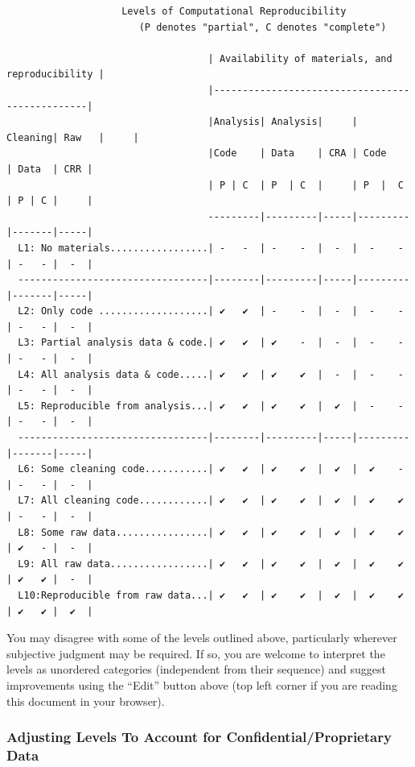 \documentclass[]{book}
\begin{document}
\begin{verbatim}
                    Levels of Computational Reproducibility
                       (P denotes "partial", C denotes "complete")

                                   | Availability of materials, and reproducibility |
                                   |------------------------------------------------|
                                   |Analysis| Analysis|     | Cleaning| Raw   |     |
                                   |Code    | Data    | CRA | Code    | Data  | CRR |
                                   | P | C  | P  | C  |     | P  |  C | P | C |     |
                                   ---------|---------|-----|---------|-------|-----|
  L1: No materials.................| -   -  | -    -  |  -  |  -    - | -   - |  -  |
  ---------------------------------|--------|---------|-----|---------|-------|-----|
  L2: Only code ...................| ✔   ✔  | -    -  |  -  |  -    - | -   - |  -  |
  L3: Partial analysis data & code.| ✔   ✔  | ✔    -  |  -  |  -    - | -   - |  -  |
  L4: All analysis data & code.....| ✔   ✔  | ✔    ✔  |  -  |  -    - | -   - |  -  |
  L5: Reproducible from analysis...| ✔   ✔  | ✔    ✔  |  ✔  |  -    - | -   - |  -  |
  ---------------------------------|--------|---------|-----|---------|-------|-----|
  L6: Some cleaning code...........| ✔   ✔  | ✔    ✔  |  ✔  |  ✔    - | -   - |  -  |
  L7: All cleaning code............| ✔   ✔  | ✔    ✔  |  ✔  |  ✔    ✔ | -   - |  -  |
  L8: Some raw data................| ✔   ✔  | ✔    ✔  |  ✔  |  ✔    ✔ | ✔   - |  -  |
  L9: All raw data.................| ✔   ✔  | ✔    ✔  |  ✔  |  ✔    ✔ | ✔   ✔ |  -  |
  L10:Reproducible from raw data...| ✔   ✔  | ✔    ✔  |  ✔  |  ✔    ✔ | ✔   ✔ |  ✔  |
\end{verbatim}

You may disagree with some of the levels outlined above, particularly wherever subjective judgment may be required. If so, you are welcome to interpret the levels as unordered categories (independent from their sequence) and suggest improvements using the ``Edit'' button above (top left corner if you are reading this document in your browser).

\hypertarget{adjusting-levels-to-account-for-confidentialproprietary-data}{%
\subsubsection*{Adjusting Levels To Account for Confidential/Proprietary Data}\label{adjusting-levels-to-account-for-confidentialproprietary-data}}
\end{document}
